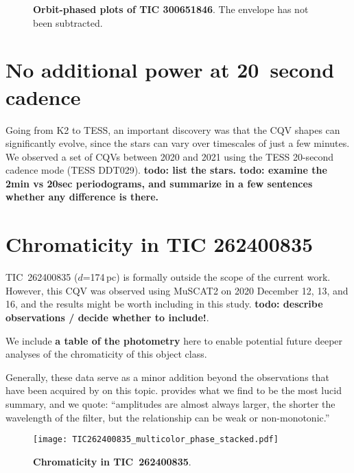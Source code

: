 \documentclass[11pt,twocolumn,tighten]{aastex63}
\begin{document}
\begin{figure*}[!t]
	\begin{center}
	\end{center}
	\vspace{-0.4cm}
	\caption{
		{\bf Orbit-phased plots of TIC 300651846}.
		The envelope has not been subtracted.
	}
	\label{fig:tic3006timegroups}
\end{figure*}



\section{No additional power at 20~second cadence}

Going from K2 to TESS, an important discovery was that the CQV shapes
can significantly evolve, since the stars can vary over timescales of just a few minutes.
We observed a set of CQVs between 2020 and 2021 using the TESS 20-second
cadence mode (TESS DDT029).
{\bf todo: list the stars.  todo: examine the 2min vs 20sec periodograms, and summarize in a few
sentences whether any difference is there.}


\section{Chromaticity in TIC 262400835}

TIC~262400835 ($d$=174\,pc) is formally outside the scope of the
current work.  However, this CQV was observed using MuSCAT2 on 2020
December 12, 13, and 16, and the results might be worth including in
this study.
{\bf todo: describe observations / decide whether to include!}.

We include {\bf a table of the photometry} here to enable potential
future deeper analyses of the chromaticity of this object class.

Generally, these data serve as a minor addition beyond the
observations that have been acquired by
\citet[e.g.][]{2017PASJ...69L...2O,2020PASJ...72...23T,2022AJ....163..144G,2023MNRAS.518.2921K}
on this topic.  \citet{2023MNRAS.518.2921K} provides what we find to
be the most lucid summary, and we quote: ``amplitudes are almost
always larger, the shorter the wavelength of the filter, but the
relationship can be weak or non-monotonic.''

\begin{figure*}[!t]
	\begin{center}
    \texttt{[image: TIC262400835\_multicolor\_phase\_stacked.pdf]}
    	\end{center}
    \vspace{-0.4cm}
		\caption{
	      {\bf Chromaticity in TIC~262400835}.
		}
		\label{fig:muscat}
\end{figure*}



\clearpage
\listofchanges
\end{document}
